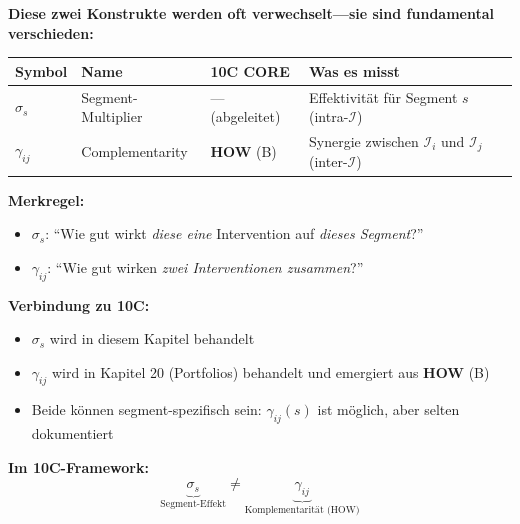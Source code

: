 \begin{tcolorbox}[colback=orange!5!white, colframe=orange!75!black,
    title=\textbf{KLARSTELLUNG: $\sigma_s$ vs.\ $\gamma_{ij}$ (10C HOW)}]

\textbf{Diese zwei Konstrukte werden oft verwechselt---sie sind fundamental verschieden:}

\begin{center}
\renewcommand{\arraystretch}{1.4}
\begin{tabular}{@{}llll@{}}
\toprule
\textbf{Symbol} & \textbf{Name} & \textbf{10C CORE} & \textbf{Was es misst} \\
\midrule
$\sigma_s$ & Segment-Multiplier & --- (abgeleitet) & Effektivität für Segment $s$ (intra-$\mathcal{I}$) \\
$\gamma_{ij}$ & Complementarity & \textbf{HOW} (B) & Synergie zwischen $\mathcal{I}_i$ und $\mathcal{I}_j$ (inter-$\mathcal{I}$) \\
\bottomrule
\end{tabular}
\end{center}

\textbf{Merkregel:}
\begin{itemize}[nosep]
\item $\sigma_s$: ``Wie gut wirkt \textit{diese eine} Intervention auf \textit{dieses Segment}?''
\item $\gamma_{ij}$: ``Wie gut wirken \textit{zwei Interventionen zusammen}?''
\end{itemize}

\textbf{Verbindung zu 10C:}
\begin{itemize}[nosep]
\item $\sigma_s$ wird in diesem Kapitel behandelt
\item $\gamma_{ij}$ wird in Kapitel 20 (Portfolios) behandelt und emergiert aus \textbf{HOW} (B)
\item Beide können segment-spezifisch sein: $\gamma_{ij}(s)$ ist möglich, aber selten dokumentiert
\end{itemize}

\textbf{Im 10C-Framework:}
\begin{equation}
\underbrace{\sigma_s}_{\text{Segment-Effekt}} \neq \underbrace{\gamma_{ij}}_{\text{Komplementarität (HOW)}}
\end{equation}

\end{tcolorbox}

